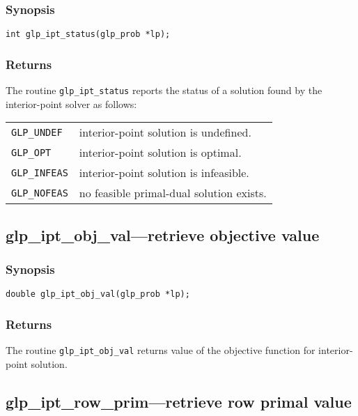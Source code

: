 \subsubsection*{Synopsis}

\begin{verbatim}
int glp_ipt_status(glp_prob *lp);
\end{verbatim}

\subsubsection*{Returns}

The routine \verb|glp_ipt_status| reports the status of a solution
found by the interior-point solver as follows:

\begin{tabular}{@{}p{25mm}p{91.3mm}@{}}
\verb|GLP_UNDEF| & interior-point solution is undefined. \\
\verb|GLP_OPT|   & interior-point solution is optimal. \\
\verb|GLP_INFEAS|& interior-point solution is infeasible. \\
\verb|GLP_NOFEAS|& no feasible primal-dual solution exists.\\
\end{tabular}

\subsection{glp\_ipt\_obj\_val---retrieve objective value}

\subsubsection*{Synopsis}

\begin{verbatim}
double glp_ipt_obj_val(glp_prob *lp);
\end{verbatim}

\subsubsection*{Returns}

The routine \verb|glp_ipt_obj_val| returns value of the objective
function for interior-point solution.

\subsection{glp\_ipt\_row\_prim---retrieve row primal value}

